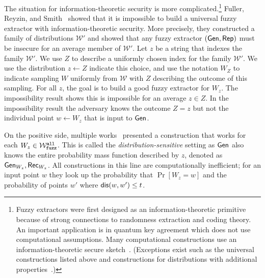 The situation for information-theoretic security is more
complicated.\footnote{Fuzzy extractors were first designed as an
  information-theoretic primitive because of strong connections to
  randomness extraction and coding theory.  An important application is in quantum key agreement which does not use computational assumptions.  Many computational
  constructions use an information-theoretic secure
  sketch~\cite{wen2018robustly,wen2019generic}.  (Exceptions exist
  such as the universal constructions listed above and constructions
  for distributions with additional
  properties~\cite{apon2017efficient,alamelou2018pseudoentropic,fuller2020computational,canetti2021reusable}.)
}  Fuller, Reyzin, and Smith~\cite{fuller2020fuzzy} showed that it is
impossible to build a universal fuzzy extractor with
information-theoretic security.  More precisely, they constructed a
family of distributions $\mathcal{W}'$ and showed that any
fuzzy extractor $({\mathsf{Gen}}, {\mathsf{Rep}})$ must be insecure for an average member
of $\mathcal{W}'$. Let $z$ be a string that indexes the family $\mathcal{W}'$. We use $Z$ to describe a uniformly chosen index for
the family $\mathcal{W'}$.  We use the distribution $z\leftarrow Z$ indicate this choice, and use the notation $W_Z$ to indicate sampling $W$ uniformly from $\mathcal{W}$ with $Z$ describing the outcome of this sampling. For all $z$, the goal is to build a good fuzzy extractor for $W_z$.  The impossibility result shows this is impossible for an average $z\in Z$.  In the impossibility result the adversary knows the outcome $Z=z$ but not the
individual point $w\leftarrow W_z$ that is input to ${\mathsf{Gen}}$.

On the positive side, multiple works~\cite{hayashi2014secret,hayashi2016secret,fuller2016fuzzy,woodage2017new,tyagi2017universal,TVW18,LA18,fuller2019continuous,fuller2020fuzzy} presented a construction that works for each $W_z\in \mathcal{W}_{\mathtt{fuzz}}^{\mathtt{all}}$.  This is called the \emph{distribution-sensitive} setting as ${\mathsf{Gen}}$ also knows the entire probability mass function described by $z$, denoted as ${\mathsf{Gen}}_{W_z}, {\mathsf{Rec}}_{W_z}$.  All constructions in this line are computationally inefficient; for an input point $w$ they look up the probability that $\Pr[W_z=w]$ and the probability of points $w'$ where $\mathsf{dis}(w, w')\le t$.  

